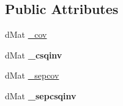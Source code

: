\subsection*{Public Attributes}
\begin{DoxyCompactItemize}
\item 
d\-Mat \hyperlink{classlibcmaes_1_1CMASolutions_aa3699ac23ef9be0bc60be0a6417891fe}{\-\_\-cov}
\item 
\hypertarget{classlibcmaes_1_1CMASolutions_ac6e9412377ee1a808b70e578e22ffb20}{d\-Mat {\bfseries \-\_\-csqinv}}\label{classlibcmaes_1_1CMASolutions_ac6e9412377ee1a808b70e578e22ffb20}

\item 
d\-Mat \hyperlink{classlibcmaes_1_1CMASolutions_a2ae1e479582128f96be7a39ac6db57dd}{\-\_\-sepcov}
\item 
\hypertarget{classlibcmaes_1_1CMASolutions_ac7bae8542560b6d9b1b87c08d7921df1}{d\-Mat {\bfseries \-\_\-sepcsqinv}}\label{classlibcmaes_1_1CMASolutions_ac7bae8542560b6d9b1b87c08d7921df1}


\end{DoxyCompactItemize}
